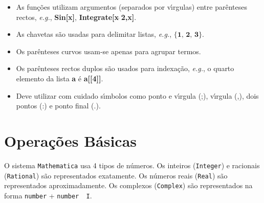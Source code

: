 \documentclass[11pt]{article}
\begin{document}
\begin{itemize}
\item As fun\c{c}\~oes utilizam argumentos (separados por v\'\i rgulas) ent\-re par\^enteses rectos, \textsl{e.g.}, \textbf{Sin[x]}, \textbf{Integrate[x$\,\hat{}\, $2,x]}.



\item As chavetas s\~ao usadas para delimitar listas,  \textsl{e.g.}, $\textbf{\{1, 2, 3\}}$. 


\item Os par\^enteses curvos usam-se apenas para agrupar termos. 



\item Os par\^enteses rectos duplos s\~ao usados para indexa\c{c}\~ao, \textsl{e.g.},  o quarto elemento da lista \textbf{a} \'e \textbf{a[[4]]}.



\item Deve utilizar com cuidado s\'\i mbolos como ponto e  v\'\i rgula (;), v\'\i rgula (,), dois pontos (:) e ponto final (.).


\end{itemize}

\pagebreak


\section{Opera\c{c}\~oes B\'asicas  }



O sistema \texttt{Mathematica} usa 4 tipos de n\'umeros. Os inteiros (\texttt{Integer}) e racionais (\texttt{Rational}) s\~ao representados exatamente. Os n\'umeros reais (\texttt{Real}) s\~ao representados aproximadamente. Os complexos (\texttt{Complex}) s\~ao representados na forma \texttt{number} + \texttt{number\, I}.
\end{document}
